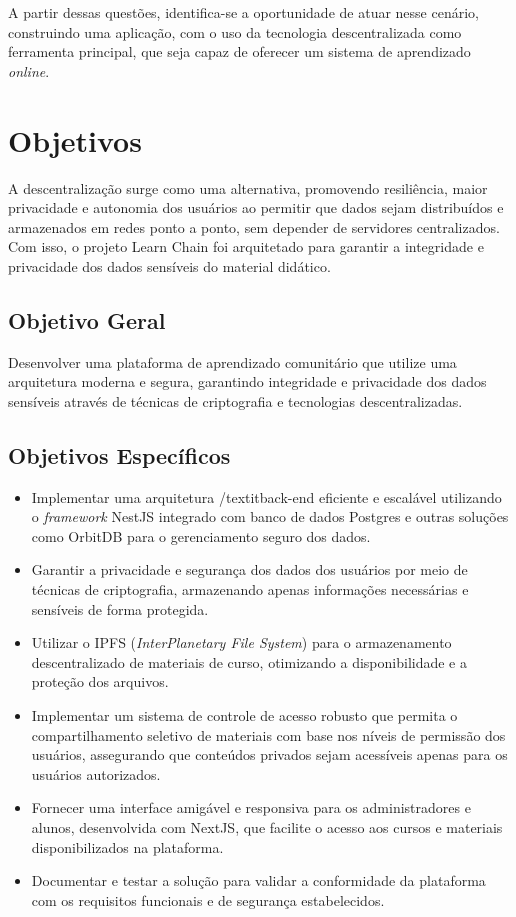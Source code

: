 A partir dessas questões, identifica-se a oportunidade de atuar nesse cenário, construindo uma aplicação, com o uso da tecnologia descentralizada como ferramenta principal, que seja capaz de oferecer um sistema de aprendizado \textit{online}.

\section{Objetivos}

A descentralização surge como uma alternativa, promovendo resiliência, maior privacidade e autonomia dos usuários ao permitir que dados sejam distribuídos e armazenados em redes ponto a ponto, sem depender de servidores centralizados. Com isso, o projeto Learn Chain foi arquitetado para garantir a integridade e privacidade dos dados sensíveis do material didático. 

\subsection{Objetivo Geral}

Desenvolver uma plataforma de aprendizado comunitário que utilize uma arquitetura moderna e segura, garantindo integridade e privacidade dos dados sensíveis através de técnicas de criptografia e tecnologias descentralizadas.

\subsection{Objetivos Específicos}

\begin{itemize}
    \item Implementar uma arquitetura /textit{back-end} eficiente e escalável utilizando o \textit{framework} NestJS integrado com banco de dados Postgres e outras soluções como OrbitDB para o gerenciamento seguro dos dados.
    \item Garantir a privacidade e segurança dos dados dos usuários por meio de técnicas de criptografia, armazenando apenas informações necessárias e sensíveis de forma protegida.
    \item Utilizar o IPFS (\textit{InterPlanetary File System}) para o armazenamento descentralizado de materiais de curso, otimizando a disponibilidade e a proteção dos arquivos.
    \item Implementar um sistema de controle de acesso robusto que permita o compartilhamento seletivo de materiais com base nos níveis de permissão dos usuários, assegurando que conteúdos privados sejam acessíveis apenas para os usuários autorizados.
    \item Fornecer uma interface amigável e responsiva para os administradores e alunos, desenvolvida com NextJS, que facilite o acesso aos cursos e materiais disponibilizados na plataforma.
    \item Documentar e testar a solução para validar a conformidade da plataforma com os requisitos funcionais e de segurança estabelecidos.
\end{itemize}

